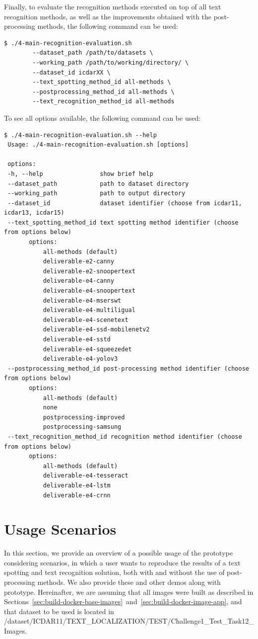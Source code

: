 Finally, to evaluate the recognition methods executed on top of all text recognition methods, as well as the improvements obtained with the post-processing methods, the following command can be used:
\begin{lstlisting}[style=fancyterminal]
 $ ./4-main-recognition-evaluation.sh 
        --dataset_path /path/to/datasets \
        --working_path /path/to/working/directory/ \
        --dataset_id icdarXX \
        --text_spotting_method_id all-methods \
        --postprocessing_method_id all-methods \
        --text_recognition_method_id all-methods
\end{lstlisting}

To see all options available, the following command can be used:
\begin{lstlisting}[style=fancyterminal]
 $ ./4-main-recognition-evaluation.sh --help
 Usage: ./4-main-recognition-evaluation.sh [options]
 
 options:
 -h, --help                show brief help
 --dataset_path            path to dataset directory
 --working_path            path to output directory
 --dataset_id              dataset identifier (choose from icdar11, icdar13, icdar15)
 --text_spotting_method_id text spotting method identifier (choose from options below)
       options:
           all-methods (default)
           deliverable-e2-canny
           deliverable-e2-snoopertext
           deliverable-e4-canny
           deliverable-e4-snoopertext
           deliverable-e4-mserswt
           deliverable-e4-multiligual
           deliverable-e4-scenetext
           deliverable-e4-ssd-mobilenetv2
           deliverable-e4-sstd
           deliverable-e4-squeezedet
           deliverable-e4-yolov3
 --postprocessing_method_id post-processing method identifier (choose from options below)
       options:
           all-methods (default)
           none
           postprocessing-improved
           postprocessing-samsung
 --text_recognition_method_id recognition method identifier (choose from options below)
       options:
           all-methods (default)
           deliverable-e4-tesseract
           deliverable-e4-lstm
           deliverable-e4-crnn

\end{lstlisting}


\section{Usage Scenarios}
\label{sec:usage-scenario}

In this section, we provide an overview of a possible usage of the prototype considering scenarios, in which a user wants to reproduce the results of a text spotting and text recognition solution, both with and without the use of post-processing methods. We also provide these and other demos along with prototype. Hereinafter, we are assuming that all images were built as described in Sections~\ref{sec:build-docker-base-images}~and~\ref{sec:build-docker-image-app}, and that dataset to be used is located in {\footnotesize \ttfamily /dataset/ICDAR11/TEXT\_LOCALIZATION/TEST/Challenge1\_Test\_Task12\_Images}.

